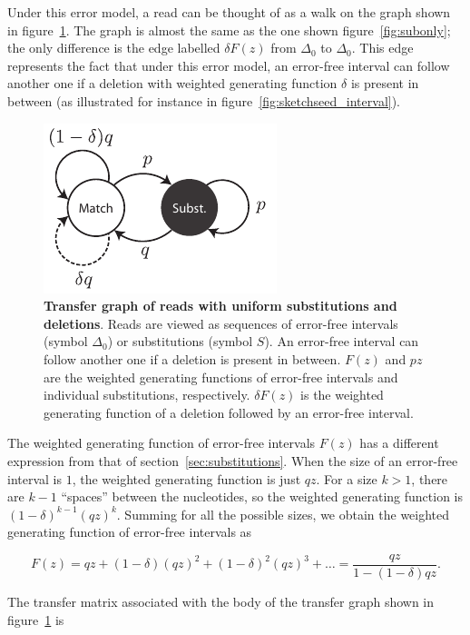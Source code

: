 \documentclass{article}
\begin{document}
Under this error model, a read can be thought of as a walk on the graph
shown in figure~\ref{fig:deletions}. The graph is almost the same as the
one shown figure~\ref{fig:subonly}; the only difference is the edge
labelled $\delta F(z)$ from $\Delta_0$ to $\Delta_0$. This edge represents
the fact that under this error model, an error-free interval can follow
another one if a deletion with weighted generating function $\delta$ is
present in between (as illustrated for instance in
figure~\ref{fig:sketchseed_interval}).

\begin{figure}[h]
\centering
\includegraphics[scale=0.9]{deletions.pdf}
\caption{\textbf{Transfer graph of reads with uniform substitutions and
deletions}. Reads are viewed as sequences of error-free intervals (symbol
$\Delta_0$) or substitutions (symbol $S$). An error-free interval can
follow another one if a deletion is present in between. $F(z)$ and $pz$
are the weighted generating functions of error-free intervals and
individual substitutions, respectively. $\delta F(z)$ is the weighted
generating function of a deletion followed by an error-free interval.}
\label{fig:deletions}
\end{figure}

The weighted generating function of error-free intervals $F(z)$ has a
different expression from that of section~\ref{sec:substitutions}. When
the size of an error-free interval is $1$, the weighted generating
function is just $qz$. For a size $k > 1$, there are $k-1$ ``spaces''
between the nucleotides, so the weighted generating function is
$(1-\delta)^{k-1}(qz)^k$. Summing for all the possible sizes, we obtain
the weighted generating function of error-free intervals as

\begin{equation}
\label{eq:Fdel}
F(z) = qz + (1-\delta)(qz)^2 + (1-\delta)^2(qz)^3 + \ldots =
\frac{qz}{1-(1-\delta)qz}.
\end{equation}

The transfer matrix associated with the body of the transfer graph shown
in figure~\ref{fig:deletions} is
\end{document}
